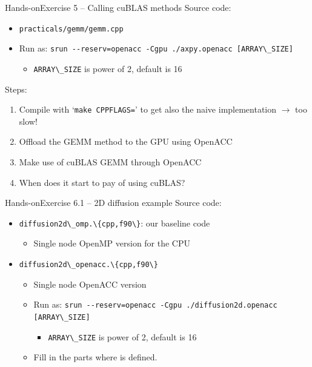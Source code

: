 \documentclass[12pt,aspectratio=169]{beamer}
\newcommand\shinline[2][]{\lstinline[style=shstyle,basicstyle=\ttfamily,#1]!#2!}
\begin{document}
\begin{frame}[fragile]{Hands-on}{Exercise 5 -- Calling cuBLAS methods}
  Source code:
  \begin{itemize}
  \item \shinline{practicals/gemm/gemm.cpp}
  \item Run as: \shinline{srun --reserv=openacc -Cgpu ./axpy.openacc [ARRAY\_SIZE]}
    \begin{itemize}
    \item \shinline{ARRAY\_SIZE} is power of 2, default is 16
    \end{itemize}
  \end{itemize}
  \vfill
  Steps:
  \begin{enumerate}
  \item Compile with `\shinline{make CPPFLAGS=}' to get also the naive implementation $\rightarrow$ too slow!
  \item Offload the GEMM method to the GPU using OpenACC
  \item Make use of cuBLAS GEMM through OpenACC
  \item When does it start to pay of using cuBLAS?
  \end{enumerate}
\end{frame}

\begin{frame}[fragile]{Hands-on}{Exercise 6.1 -- 2D diffusion example}
  Source code:
  \begin{itemize}
  \item \shinline{diffusion2d\_omp.\{cpp,f90\}}: our baseline code
    \begin{itemize}
    \item Single node OpenMP version for the CPU
    \end{itemize}
  \item \shinline{diffusion2d\_openacc.\{cpp,f90\}}
    \begin{itemize}
    \item Single node OpenACC version
      \item Run as: \shinline{srun --reserv=openacc -Cgpu ./diffusion2d.openacc [ARRAY\_SIZE]}
        \begin{itemize}
        \item \shinline{ARRAY\_SIZE} is power of 2, default is 16
        \end{itemize}
      \item Fill in the parts where  is defined.
    \end{itemize}
  \end{itemize}
\end{frame}
\end{document}

